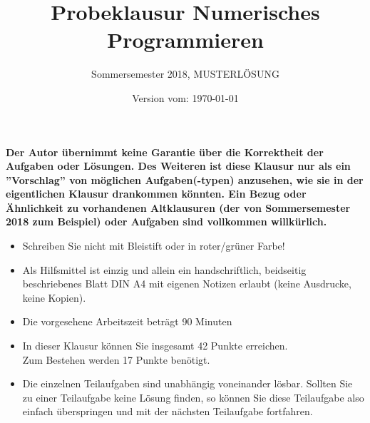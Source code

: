 \documentclass{scrartcl}
\begin{document}
\title{Probeklausur Numerisches Programmieren}
\subtitle{Sommersemester 2018, MUSTERLÖSUNG}
\author{\npauthor{}}
\date{Version vom: \today}
\maketitle

\textbf{Der Autor übernimmt keine Garantie über die Korrektheit der Aufgaben oder Lösungen. \n Des Weiteren ist diese Klausur nur als ein ''Vorschlag'' von möglichen Aufgaben(-typen) anzusehen, wie sie in der eigentlichen Klausur drankommen könnten. Ein Bezug oder Ähnlichkeit zu vorhandenen Altklausuren (der von Sommersemester 2018 zum Beispiel) oder Aufgaben sind vollkommen willkürlich.}
\sbreak

\begin{itemize}
	\item Schreiben Sie nicht mit Bleistift oder in roter/grüner Farbe!
	\item Als Hilfsmittel ist einzig und allein ein handschriftlich, beidseitig beschriebenes Blatt DIN A4 mit eigenen Notizen erlaubt (keine Ausdrucke, keine Kopien).
	\item Die vorgesehene Arbeitszeit beträgt 90 Minuten
	\item In dieser Klausur können Sie insgesamt 42 Punkte erreichen. \\Zum Bestehen werden 17 Punkte benötigt.
	\item Die einzelnen Teilaufgaben sind unabhängig voneinander lösbar.
	Sollten Sie zu einer Teilaufgabe keine Lösung finden, so können Sie diese Teilaufgabe also einfach überspringen und mit der nächsten Teilaufgabe fortfahren.
\end{itemize}


	
\end{document}
